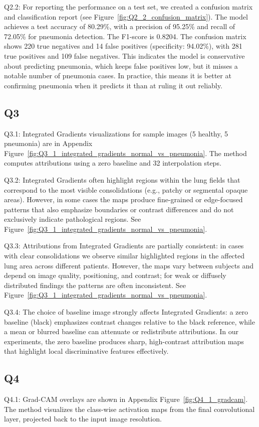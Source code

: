 Q2.2: For reporting the performance on a test set, we created a confusion matrix and classification report (see Figure~\ref{fig:Q2_2_confusion_matrix}). The model achieves a test accuracy of 80.29\%, with a precision of 95.25\% and recall of 72.05\% for pneumonia detection. The F1-score is 0.8204. The confusion matrix shows 220 true negatives and 14 false positives (specificity: 94.02\%), with 281 true positives and 109 false negatives. This indicates the model is conservative about predicting pneumonia, which keeps false positives low, but it misses a notable number of pneumonia cases. In practice, this means it is better at confirming pneumonia when it predicts it than at ruling it out reliably.

\subsection*{Q3}
Q3.1: Integrated Gradients visualizations for sample images (5 healthy, 5 pneumonia) are in Appendix Figure~\ref{fig:Q3_1_integrated_gradients_normal_vs_pneumonia}. The method computes attributions using a zero baseline and 32 interpolation steps.

Q3.2: Integrated Gradients often highlight regions within the lung fields that correspond to the most visible consolidations (e.g., patchy or segmental opaque areas). However, in some cases the maps produce fine-grained or edge-focused patterns that also emphasize boundaries or contrast differences and do not exclusively indicate pathological regions. See Figure~\ref{fig:Q3_1_integrated_gradients_normal_vs_pneumonia}.

Q3.3: Attributions from Integrated Gradients are partially consistent: in cases with clear consolidations we observe similar highlighted regions in the affected lung area across different patients. However, the maps vary between subjects and depend on image quality, positioning, and contrast; for weak or diffusely distributed findings the patterns are often inconsistent. See Figure~\ref{fig:Q3_1_integrated_gradients_normal_vs_pneumonia}.

Q3.4: The choice of baseline image strongly affects Integrated Gradients: a zero baseline (black) emphasizes contrast changes relative to the black reference, while a mean or blurred baseline can attenuate or redistribute attributions. In our experiments, the zero baseline produces sharp, high-contrast attribution maps that highlight local discriminative features effectively.

\subsection*{Q4}
Q4.1: Grad-CAM overlays are shown in Appendix Figure~\ref{fig:Q4_1_gradcam}. The method visualizes the class-wise activation maps from the final convolutional layer, projected back to the input image resolution.

